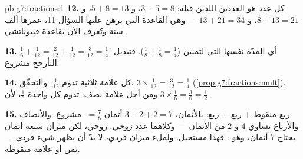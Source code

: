 \begin{solution}{pb:g7:fractions:1}
\textbf{12.} كل عدد هو  العددين اللذين قبله:
$3 + 5 = 8$، و $5 + 8 = 13$، و $8 + 13 = 21$، و $13 + 21 = 34$ ---
وهي القاعدة التي برهن عليها السؤال 11، عمرها ألف سنة وتُعرف الآن
بقاعدة فيبوناتشي.

\textbf{13.} $\frac16 + \frac{1}{12} = \frac{2}{12} +
\frac{1}{12} = \frac{3}{12} = \frac14$: أي المدّة نفسها التي
لثمنين  ($\frac18 + \frac18 = \frac14$). فتبديل
التأرجح مشروع.

\textbf{14.} كل علامة ثلاثية تدوم $\frac{1}{12}$: والتحقّق،
$3 \times \frac{1}{12} = \frac{3}{12} = \frac14$
(\cref{prop:g7:fractions:mult}). ومن أجل علامة نصف: تدوم كل واحدة
$\frac16$، لأن $3 \times \frac16 = \frac36 = \frac12$.

\textbf{15.} ربع منقوط $+$ ربع $+$ ربع: بالأثمان،
$3 + 2 + 2 = 7$ أثمان $= \frac78$: مشروع. والأنصاف والأرباع
تساوي $4$ و $2$ من الأثمان --- وكلاهما عدد \emph{زوجي}. 
 زوجي، لكن ميزان سبعة أثمان يحتاج
$7$ أثمان، وهو : فهذا مستحيل. ولملء ميزان فردي،
لا بدّ أن يظهر شيء فردي --- ثمن أو علامة منقوطة.
\end{solution}
